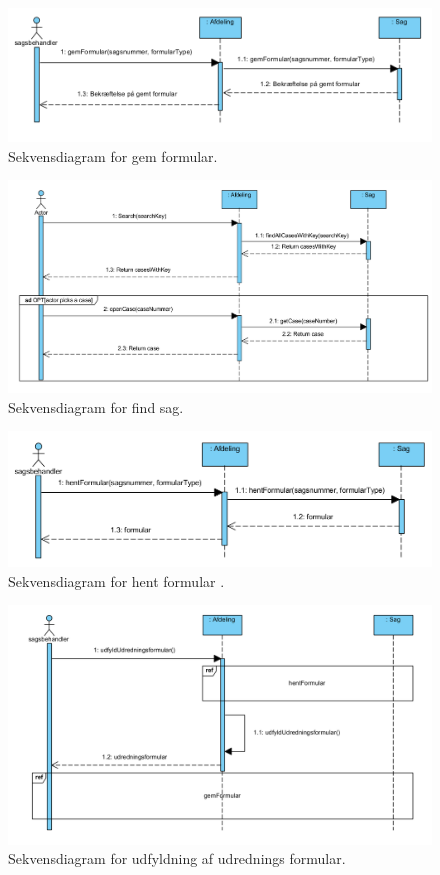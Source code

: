\begin{figure}[hbt!]
  \includegraphics[width=\linewidth]{./PNG/sekDiaGemFormular.PNG} 
  \caption{Sekvensdiagram for gem formular.}
  \label{fig:GemForm}
\end{figure}
\newpage
\begin{figure}[hbt!]
  \includegraphics[width=\linewidth]{./PNG/sekDiaFindSag.PNG} 
  \caption{Sekvensdiagram for find sag.}
  \label{fig:FindSag}
\end{figure}

\begin{figure}[hbt!]
  \includegraphics[width=\linewidth]{./PNG/sekDiaHentFormular.PNG} 
  \caption{Sekvensdiagram for hent formular .}
  \label{fig:HentForm}
\end{figure}
\newpage
\begin{figure}[hbt!]
  \includegraphics[width=\linewidth]{./PNG/sekDiaUdfyldUdredningsFormular.PNG} 
  \caption{Sekvensdiagram for udfyldning af udrednings formular.}
  \label{fig:UdForm}
\end{figure}


